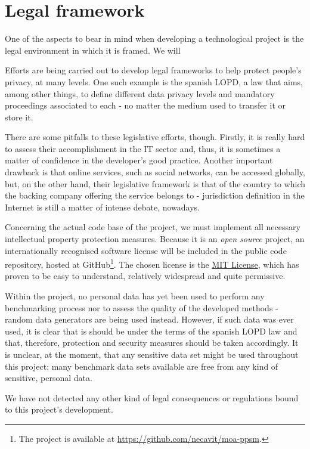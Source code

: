 \section{Legal framework}
\label{Practical::Legal}

One of the aspects to bear in mind when developing a technological project is the legal environment in which it is framed. We will 

Efforts are being carried out to develop legal frameworks to help protect people’s privacy, at many levels. One such example is the spanish LOPD, a law that aims, among other things, to define different data privacy levels and mandatory proceedings associated to each - no matter the medium used to transfer it or store it.

There are some pitfalls to these legislative efforts, though. Firstly, it is really hard to assess their accomplishment in the IT sector and, thus, it is sometimes a matter of confidence in the developer’s good practice. Another important drawback is that online services, such as social networks, can be accessed globally, but, on the other hand, their legislative framework is that of the country to which the backing company offering the service belongs to - jurisdiction definition in the Internet is still a matter of intense debate, nowadays.

Concerning the actual code base of the project, we must implement all necessary intellectual property protection measures. Because it is an \textit{open source} project, an internationally recognised software license will be included in the public code repository, hosted at GitHub\footnote{The project is available at \url{https://github.com/necavit/moa-ppsm}.}. The chosen license is the \href{http://opensource.org/licenses/MIT}{MIT License}, which has proven to be easy to understand, relatively widespread and quite permissive.

Within the project, no personal data has yet been used to perform any benchmarking process nor to assess the quality of the developed methods - random data generators are being used instead. However, if such data was ever used, it is clear that is should be under the terms of the spanish LOPD law and that, therefore, protection and security measures should be taken accordingly. It is unclear, at the moment, that any sensitive data set might be used throughout this project; many benchmark data sets available are free from any kind of sensitive, personal data.

We have not detected any other kind of legal consequences or regulations bound to this project's development.